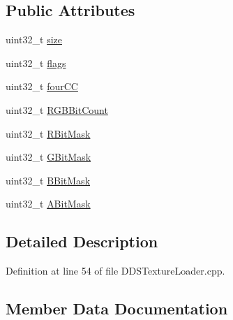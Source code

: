 \subsection*{Public Attributes}
\begin{DoxyCompactItemize}
\item 
uint32\+\_\+t \hyperlink{struct_d_d_s___p_i_x_e_l_f_o_r_m_a_t_adb357eb46848e57b8d89b59d31608f6c_adb357eb46848e57b8d89b59d31608f6c}{size}
\item 
uint32\+\_\+t \hyperlink{struct_d_d_s___p_i_x_e_l_f_o_r_m_a_t_a1909f63ad2d0a257bf5e8dba9e2d9475_a1909f63ad2d0a257bf5e8dba9e2d9475}{flags}
\item 
uint32\+\_\+t \hyperlink{struct_d_d_s___p_i_x_e_l_f_o_r_m_a_t_aa7af0012c64480e8eeafa25d7892c310_aa7af0012c64480e8eeafa25d7892c310}{four\+CC}
\item 
uint32\+\_\+t \hyperlink{struct_d_d_s___p_i_x_e_l_f_o_r_m_a_t_af53071b3c2912f56e4b54533d8101951_af53071b3c2912f56e4b54533d8101951}{R\+G\+B\+Bit\+Count}
\item 
uint32\+\_\+t \hyperlink{struct_d_d_s___p_i_x_e_l_f_o_r_m_a_t_a2d2f8c19c50ceb8677b0be2d1090c234_a2d2f8c19c50ceb8677b0be2d1090c234}{R\+Bit\+Mask}
\item 
uint32\+\_\+t \hyperlink{struct_d_d_s___p_i_x_e_l_f_o_r_m_a_t_a13f1281d9cb4a6e001541c78d58ead8b_a13f1281d9cb4a6e001541c78d58ead8b}{G\+Bit\+Mask}
\item 
uint32\+\_\+t \hyperlink{struct_d_d_s___p_i_x_e_l_f_o_r_m_a_t_a94e8f580b6c716d600be37525b3ebf44_a94e8f580b6c716d600be37525b3ebf44}{B\+Bit\+Mask}
\item 
uint32\+\_\+t \hyperlink{struct_d_d_s___p_i_x_e_l_f_o_r_m_a_t_ada163cba3be6a89fc99166b3d6d49050_ada163cba3be6a89fc99166b3d6d49050}{A\+Bit\+Mask}
\end{DoxyCompactItemize}


\subsection{Detailed Description}


Definition at line 54 of file D\+D\+S\+Texture\+Loader.\+cpp.



\subsection{Member Data Documentation}
